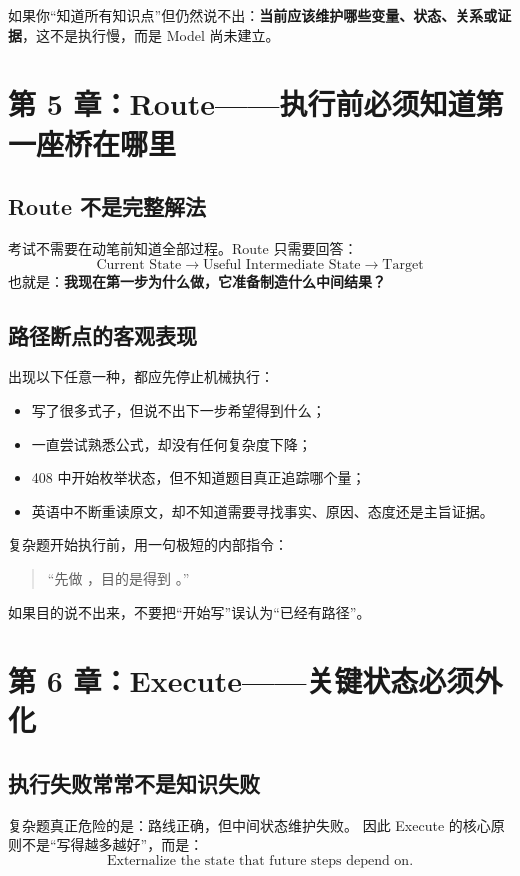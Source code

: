 \documentclass[11pt,a4paper]{ctexart}
\newcommand{\kw}[1]{\textbf{#1}}
\begin{document}
\begin{warn}[识别断点的判定]
如果你“知道所有知识点”但仍然说不出：\kw{当前应该维护哪些变量、状态、关系或证据}，这不是执行慢，而是 Model 尚未建立。
\end{warn}

\section{第 5 章：Route——执行前必须知道第一座桥在哪里}

\subsection{Route 不是完整解法}
考试不需要在动笔前知道全部过程。Route 只需要回答：
\[
\boxed{
\text{Current State}
\rightarrow
\text{Useful Intermediate State}
\rightarrow
\text{Target}
}
\]
也就是：\kw{我现在第一步为什么做，它准备制造什么中间结果？}

\subsection{路径断点的客观表现}
出现以下任意一种，都应先停止机械执行：
\begin{itemize}
  \item 写了很多式子，但说不出下一步希望得到什么；
  \item 一直尝试熟悉公式，却没有任何复杂度下降；
  \item 408 中开始枚举状态，但不知道题目真正追踪哪个量；
  \item 英语中不断重读原文，却不知道需要寻找事实、原因、态度还是主旨证据。
\end{itemize}

\begin{method}
复杂题开始执行前，用一句极短的内部指令：
\begin{quote}
“先做 \underline{\hspace{3cm}}，目的是得到 \underline{\hspace{3cm}}。”
\end{quote}
如果目的说不出来，不要把“开始写”误认为“已经有路径”。
\end{method}

\section{第 6 章：Execute——关键状态必须外化}

\subsection{执行失败常常不是知识失败}
复杂题真正危险的是：路线正确，但中间状态维护失败。
因此 Execute 的核心原则不是“写得越多越好”，而是：
\[
\boxed{\text{Externalize the state that future steps depend on.}}
\]
\end{document}
